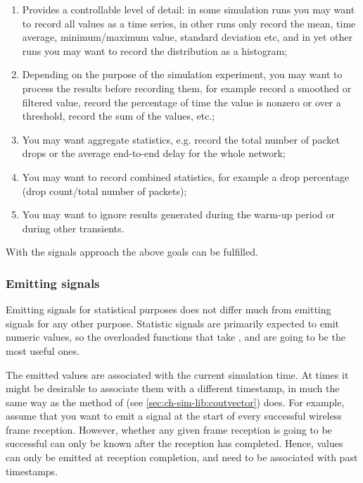\begin{enumerate}
 \item Provides a controllable level of detail: in some simulation runs
    you may want to record all values as a time series, in other runs
    only record the mean, time average, minimum/maximum value, standard
    deviation etc, and in yet other runs you may want to record the
    distribution as a histogram;
 \item Depending on the purpose of the simulation experiment, you may want
    to process the results before recording them, for example
    record a smoothed or filtered value, record the percentage of time the
    value is nonzero or over a threshold, record the sum of the values, etc.;
 \item You may want aggregate statistics, e.g. record the total number
    of packet drops or the average end-to-end delay for the whole network;
 \item You may want to record combined statistics, for example a drop
    percentage (drop count/total number of packets);
 \item You may want to ignore results generated during the warm-up period
    or during other transients.
\end{enumerate}

With the signals approach the above goals can be fulfilled.


\subsubsection{Emitting signals}

Emitting signals for statistical purposes does not differ much from
emitting signals for any other purpose. Statistic signals are primarily
expected to emit numeric values, so the overloaded  functions
that take ,  and  are going to be the
most useful ones.


The emitted values are associated with the current simulation time. At
times it might be desirable to associate them with a different timestamp,
in much the same way as the  method of
 (see \ref{sec:ch-sim-lib:coutvector}) does. For example,
assume that you want to emit a signal at the start of every successful
wireless frame reception. However, whether any given frame reception is
going to be successful can only be known after the reception has
completed. Hence, values can only be emitted at reception completion,
and need to be associated with past timestamps.

